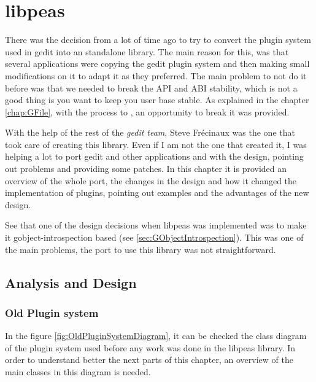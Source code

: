 
\chapter{libpeas}

There was the decision from a lot of time ago to try to convert the plugin system used in gedit into an standalone library. The main reason for this, was that several applications were copying the gedit plugin system and then making small modifications on it to adapt it as they preferred. The main problem to not do it before was that we needed to break the API and ABI stability, which is not a good thing is you want to keep you user base stable. As explained in the chapter \ref{chap:GFile}, with the process to , an opportunity to break it was provided.

With the help of the rest of the \emph{gedit team}, Steve Fr\'ecinaux was the one that took care of creating this library. Even if I am not the one that created it, I was helping a lot to port gedit and other applications and with the design, pointing out problems and providing some patches. In this chapter it is provided an overview of the whole port, the changes in the design and how it changed the implementation of plugins, pointing out examples and the advantages of the new design.

See that one of the design decisions when libpeas was implemented was to make it gobject-introspection based (see \ref{sec:GObjectIntrospection}). This was one of the main problems, the port to use this library was not straightforward.

\section{Analysis and Design}

\subsection{Old Plugin system}\label{sec:OldPluginSystem}


In the figure \ref{fig:OldPluginSystemDiagram}, it can be checked the class diagram of the plugin system used before any work was done in the libpeas library. In order to understand better the next parts of this chapter, an overview of the main classes in this diagram is needed.

